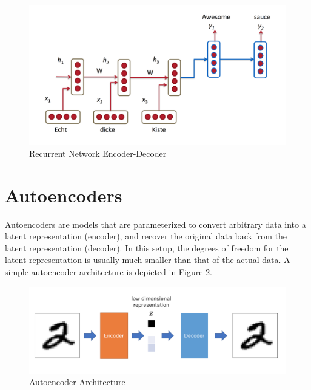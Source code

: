 \begin{figure}[ht]
	\centering
	\includegraphics[width=\textwidth]{images/rnn-nmt}
	\caption{\label{fig:rnn-nmt} Recurrent Network Encoder-Decoder}
\end{figure}


\section{Autoencoders}

Autoencoders are models that are parameterized to convert arbitrary data into a latent representation (encoder), and recover the original data back from the latent representation (decoder). In this setup, the degrees of freedom for the latent representation is usually much smaller than that of the actual data. A simple autoencoder architecture is depicted in Figure \ref{fig:autoencoder-structure}.

\begin{figure}[ht]
	\centering
	\includegraphics[width=\textwidth]{images/autoencoder-structure}
	\caption{\label{fig:autoencoder-structure} Autoencoder Architecture}
\end{figure}

